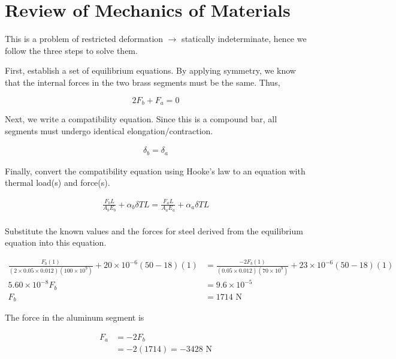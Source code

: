 \documentclass[
10pt,
a4paper,
openany,
svgnames,
]{book}
\begin{document}
\section{Review of Mechanics of Materials}

\begin{evensolution}

\item This is a problem of restricted deformation $\rightarrow$ statically indeterminate, hence we follow the three steps to solve them.

  First, establish a set of equilibrium equations. By applying symmetry, we know that the internal forces in the two brass segments must be the same. Thus,

  \begin{equation*}
    2F_b + F_a = 0
  \end{equation*}

  Next, we write a compatibility equation. Since this is a compound bar, all segments must undergo identical elongation/contraction.

  \begin{align*}
    \delta_b = \delta_a
  \end{align*}

  Finally, convert the compatibility equation using Hooke's law to an equation with thermal load(s) and force(s).

  \begin{align*}
    \frac{F_bL}{A_bE_b} + \alpha_b \delta T L = \frac{F_aL}{A_aE_a} + \alpha_a \delta T L \\
  \end{align*}

  Substitute the known values and the forces for steel derived from the equilibrium equation into this equation.

  \begin{align*}
    \frac{F_b(1)}{(2 \times 0.05 \times 0.012) (100 \times 10^9)} + 20 \times 10^{-6} (50 - 18)(1) &= \frac{-2F_b(1)}{(0.05 \times 0.012) (70 \times 10^9)} + 23 \times 10^{-6} (50 - 18)(1) \\
    5.60 \times 10^{-8} F_b &= 9.6 \times 10^{-5} \\
    F_b &= 1714 \text{ N} 
  \end{align*}

  The force in the aluminum segment is
  
  \begin{align*}
    F_a &= -2F_b \\
        &= -2(1714) = -3428 \text{ N}
  \end{align*}


\end{evensolution}
\end{document}
